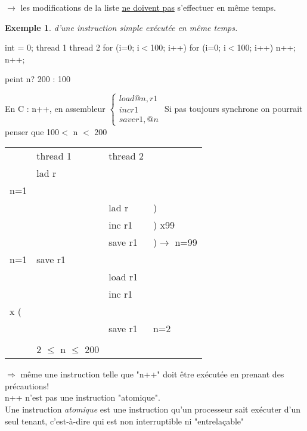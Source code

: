 \documentclass[12pt,a4paper]{report}
\newtheorem*{ex}{Exemple}
\begin{document}
$\rightarrow$ les modifications de la liste \underline{ne doivent pas} s'effectuer en même temps.\\

\begin{ex} d'une instruction simple exécutée en même temps.\end{ex}
\begin{verbatimtab}
                           int = 0;
thread 1                                thread 2
for (i=0; i$<$100; i++)                 for (i=0; i$<$100; i++)
    n++;                                     n++;

                        peint n? 200 : 100
\end{verbatimtab}
En C : n++, en assembleur $\left\{\begin{array}{l} load @n, r1\\ inc r1 \\ save r1,@n
\end{array} \right.$
Si pas toujours synchrone on pourrait penser que 100$<$ n $<$ 200\\

\begin{center}
\begin{tabular}{lp{4cm}p{4cm}l}
& thread 1 & thread 2 & \\
& lad r & &\\
n=1 & & &\\
\hdashline
& & lad r & ) \\
& & inc r1 & ) x99\\
& & save r1 & )$\rightarrow$ n=99\\
\hdashline
n=1 & save r1 & & \\
\hdashline
& & load r1 & \\
& & inc r1 & \\
\hdashline
99 x ( & & &\\
\hdashline
& & save r1 & n=2\\
\\
& 2 $\leq$ n $\leq$ 200
\end{tabular}
\end{center}

$\Rightarrow$ même une instruction telle que "n++" doit être exécutée en prenant des précautions!\\
n++ n'est pas une instruction "atomique".\\
Une instruction \emph{atomique} est une instruction qu'un processeur sait exécuter d'un seul tenant, c'est-à-dire qui est non interruptible ni "entrelaçable"\\
\end{document}
